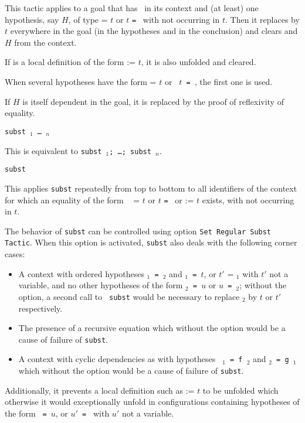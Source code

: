 \begin{coq_example*}
This tactic applies to a goal that has \ident\ in its context and (at
least) one hypothesis, say $H$, of type {\tt \ident} = $t$ or $t$
{\tt = \ident} with {\ident} not occurring in $t$.  Then it replaces
{\ident} by $t$ everywhere in the goal (in the hypotheses and in the
conclusion) and clears {\ident} and $H$ from the context.

If {\ident} is a local definition of the form {\ident} := $t$, it is
also unfolded and cleared.

\Rem
When several hypotheses have the form {\tt \ident} = $t$ or {\tt
  $t$ = \ident}, the first one is used.

\Rem
If $H$ is itself dependent in the goal, it is replaced by the
proof of reflexivity of equality.

\begin{Variants}
  \item {\tt subst \ident$_1$ {\dots} \ident$_n$}

    This is equivalent to {\tt subst \ident$_1$; \dots; subst \ident$_n$}.
  \item {\tt subst}

    This applies {\tt subst} repeatedly from top to bottom to all
    identifiers of the context for which an equality of the form {\tt
      \ident} = $t$ or $t$ {\tt = \ident} or {\tt \ident} := $t$ exists, with
    {\ident} not occurring in $t$.

 The behavior of {\tt subst} can be controlled
using option {\tt Set Regular Subst Tactic}. When this option is
activated, {\tt subst} also deals with the following corner cases:
\begin{itemize}
\item A context with ordered hypotheses {\tt \ident$_1$ = \ident$_2$}
  and {\tt \ident$_1$ = $t$}, or {$t'$ = \ident$_1$} with $t'$ not a
  variable, and no other hypotheses of the form {\tt \ident$_2$ = $u$}
  or {\tt $u$ = \ident$_2$}; without the option, a second call to {\tt
    subst} would be necessary to replace {\ident$_2$} by $t$ or $t'$
  respectively.

\item The presence of a recursive equation which without the option
  would be a cause of failure of {\tt subst}.

\item A context with cyclic dependencies as with hypotheses {\tt
  \ident$_1$ = f~\ident$_2$} and {\tt \ident$_2$ = g~\ident$_1$} which
  without the option would be a cause of failure of {\tt subst}.
\end{itemize}
Additionally, it prevents a local definition such as {\tt \ident} :=
  $t$ to be unfolded which otherwise it would exceptionally unfold in
configurations containing hypotheses of the form {\tt {\ident} = $u$},
or {\tt $u'$ = \ident} with $u'$ not a variable.


\end{Variants}
\end{coq_example*}
